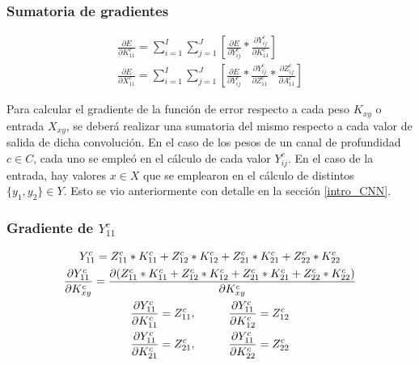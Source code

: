 \subsubsection{Sumatoria de gradientes}

\begin{gather}
	\frac{\partial E}{\partial K^c_{11}} = \sum_{i=1}^{I}\sum_{j=1}^{J}  [\frac{\partial E}{\partial Y^c_{ij}} * \frac{\partial Y^c_{ij}}{\partial K^c_{11}}] \\
	\frac{\partial E}{\partial X^c_{11}} = \sum_{i=1}^{I}\sum_{j=1}^{J}  [\frac{\partial E}{\partial Y^c_{ij}} * \frac{\partial Y^c_{ij}}{\partial Z^c_{11}} * \frac{\partial Z^c_{ij}}{\partial A^c_{11}}] 
\end{gather}

Para calcular el gradiente de la función de error respecto a cada peso $K_{xy}$ o entrada $X_{xy}$, se deberá realizar una sumatoria del mismo respecto a cada valor de salida de dicha convolución. En el caso de los pesos de un canal de profundidad $c \in C$, cada uno se empleó en el cálculo de cada valor $Y^c_{ij}$. En el caso de la entrada, hay valores $x \in X $ que se emplearon en el cálculo de distintos $\{y_1, y_2\} \in Y$. Esto se vio anteriormente con detalle en la sección \ref{intro_CNN}.

\subsubsection{Gradiente de $Y^c_{11}$}

\begin{gather}
	Y^c_{11} = Z^c_{11} * K^c_{11} + Z^c_{12} * K^c_{12} + Z^c_{21} * K^c_{21} + Z^c_{22} * K^c_{22} \label{grad_y11_k_11} \\
	\frac{\partial Y^c_{11}}{\partial K^c_{xy}} = \frac{\partial (Z^c_{11} * K^c_{11} + Z^c_{12} * K^c_{12} + Z^c_{21} * K^c_{21} + Z^c_{22} * K^c_{22})}{\partial K^c_{xy}} \label{grad_y11_k_12} \\
	\frac{\partial Y^c_{11}}{\partial K^c_{11}} = Z^c_{11}, \hspace{10mm} \frac{\partial Y^c_{11}}{\partial K^c_{12}} = Z^c_{12} \label{grad_y11_k_21}\\
	\frac{\partial Y^c_{11}}{\partial K^c_{21}} = Z^c_{21}, \hspace{10mm} \frac{\partial Y^c_{11}}{\partial K^c_{22}} = Z^c_{22} \label{grad_y11_k_22}
\end{gather}

